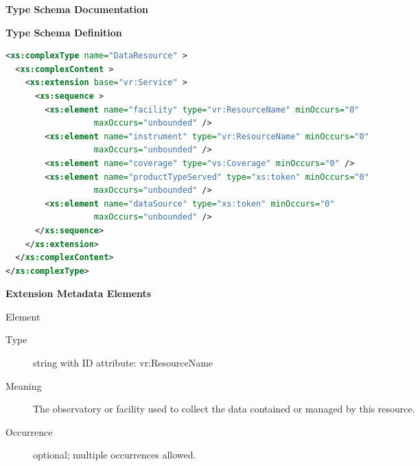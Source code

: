 \documentclass[11pt,a4paper]{ivoa}
\begin{document}
\begin{generated}
\begingroup
        \renewcommand*\descriptionlabel[1]{%
        \hbox to 5.5em{\emph{#1}\hfil}}\vspace{2ex}\noindent\textbf{ Type Schema Documentation}



\vspace{1ex}\noindent\textbf{ Type Schema Definition}

\begin{lstlisting}[language=XML,basicstyle=\footnotesize]
<xs:complexType name="DataResource" >
  <xs:complexContent >
    <xs:extension base="vr:Service" >
      <xs:sequence >
        <xs:element name="facility" type="vr:ResourceName" minOccurs="0"
                  maxOccurs="unbounded" />
        <xs:element name="instrument" type="vr:ResourceName" minOccurs="0"
                  maxOccurs="unbounded" />
        <xs:element name="coverage" type="vs:Coverage" minOccurs="0" />
        <xs:element name="productTypeServed" type="xs:token" minOccurs="0"
                  maxOccurs="unbounded" />
        <xs:element name="dataSource" type="xs:token" minOccurs="0"
                  maxOccurs="unbounded" />
      </xs:sequence>
    </xs:extension>
  </xs:complexContent>
</xs:complexType>
\end{lstlisting}

\vspace{0.5ex}\noindent\textbf{ Extension Metadata Elements}

\begingroup\small\begin{bigdescription}\item[Element \xmlel{facility}]
\begin{description}
\item[Type] string with ID attribute: vr:ResourceName
\item[Meaning] The observatory or facility used to collect the data
                     contained or managed by this resource.
\item[Occurrence] optional; multiple occurrences allowed.


\end{description}
\end{bigdescription}
\end{generated}
\end{document}
